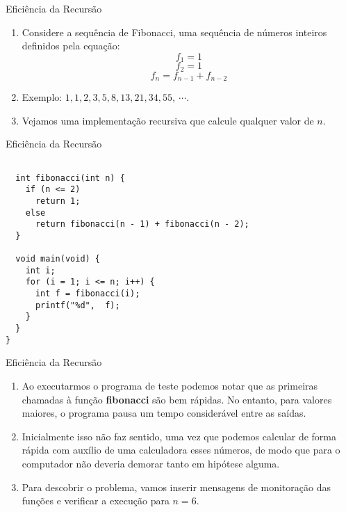 \begin{frame}[fragile]{Eficiência da Recursão}
\begin{enumerate}
	\item Considere a sequência de Fibonacci, uma sequência de números inteiros definidos pela equação:
	$$f_1 = 1$$
	$$f_2 = 1$$
	$$f_n = f_{n - 1} + f_{n - 2}$$
	\item Exemplo: $1,1,2,3,5,8,13,21,34,55, \ \cdots$.
	\item Vejamos uma implementação recursiva que calcule qualquer valor de $n$.	
\end{enumerate}
\end{frame}

\begin{frame}[fragile]{Eficiência da Recursão}
\tiny{
\begin{lstlisting}

  int fibonacci(int n) {				
    if (n <= 2)
      return 1;
    else
      return fibonacci(n - 1) + fibonacci(n - 2);		
  }

  void main(void) {
    int i;
    for (i = 1; i <= n; i++) {
      int f = fibonacci(i);
      printf("%d",  f);
    }
  }
}
\end{lstlisting}
}
\end{frame}

\begin{frame}[fragile]{Eficiência da Recursão}

\begin{enumerate}
	\item Ao executarmos o programa de teste podemos notar que as primeiras chamadas à função \textbf{fibonacci} são bem rápidas. No entanto, para valores maiores, o programa pausa um tempo considerável entre as saídas.
	\item Inicialmente isso não faz sentido, uma vez que podemos calcular de forma rápida com auxílio de uma calculadora esses números, de modo que para o computador não deveria demorar tanto em hipótese alguma.
	\item Para descobrir o problema, vamos inserir mensagens de monitoração das funções e verificar a execução para $n = 6$.
\end{enumerate}
\end{frame}

